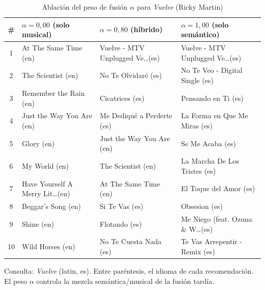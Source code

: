 \begin{table}[htbp]
  \centering
  \begin{threeparttable}
  \caption{Ablación del peso de fusión $\alpha$ para \emph{Vuelve} (Ricky Martin)}
  \label{tab:qual_ablation_vuelve}
  \footnotesize
  \begin{tabular}{c p{3.9cm} p{3.9cm} p{3.9cm}}
    \toprule
    \# & $\alpha=0{,}00$ (solo musical) & $\alpha=0{,}80$ (híbrido) & $\alpha=1{,}00$ (solo semántico) \\
    \midrule
    1 & At The Same Time (en) & Vuelve - MTV Unplugged Ve\ldots (es) & Vuelve - MTV Unplugged Ve\ldots (es) \\
    2 & The Scientist (en) & No Te Olvidaré (es) & No Te Veo - Digital Single (es) \\
    3 & Remember the Rain (en) & Cicatrices (es) & Pensando en Ti (es) \\
    4 & Just the Way You Are (en) & Me Dediqué a Perderte (es) & La Forma en Que Me Miras (es) \\
    5 & Glory (en) & Just the Way You Are (en) & Se Me Acaba (es) \\
    6 & My World (en) & The Scientist (en) & La Marcha De Los Tristes (es) \\
    7 & Have Yourself A Merry Lit\ldots (en) & At The Same Time (en) & El Toque del Amor (es) \\
    8 & Beggar's Song (en) & Si Te Vas (es) & Obsesion (es) \\
    9 & Shine (en) & Flotando (es) & Me Niego (feat. Ozuna \& W\ldots (es) \\
    10 & Wild Horses (en) & No Te Cuesta Nada (es) & Te Vas Arrepentir - Remix (es) \\
    \bottomrule
  \end{tabular}
  \begin{tablenotes}[flushleft]
    \small
    \item Consulta: \emph{Vuelve} (latin, es). Entre paréntesis, el idioma de cada recomendación. El peso $\alpha$ controla la mezcla semántica/musical de la fusión tardía.
  \end{tablenotes}
  \end{threeparttable}
\end{table}